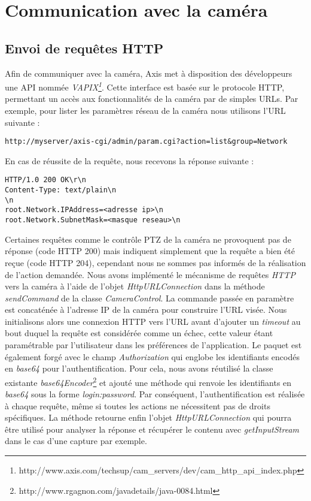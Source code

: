 \section{Communication avec la caméra}
\subsection{Envoi de requêtes HTTP}
Afin de communiquer avec la caméra, Axis met à disposition des développeurs une
API nommée \textit{VAPIX\footnote{\label{vapix}
http://www.axis.com/techsup/cam\_servers/dev/cam\_http\_api\_index.php}}. Cette
interface est basée sur le protocole HTTP, permettant un accès aux fonctionnalités de la caméra par de simples URLs. Par exemple, pour lister les paramètres réseau de la caméra nous utilisons l'URL suivante :
\begin{lstlisting}
http://myserver/axis-cgi/admin/param.cgi?action=list&group=Network
\end{lstlisting}
En cas de réussite de la requête, nous recevons la réponse suivante :
\begin{lstlisting}
HTTP/1.0 200 OK\r\n
Content-Type: text/plain\n
\n
root.Network.IPAddress=<adresse ip>\n
root.Network.SubnetMask=<masque reseau>\n
\end{lstlisting}

Certaines requêtes comme le contrôle PTZ de la caméra ne provoquent pas de réponse (code HTTP 200) mais indiquent simplement que la requête a bien été reçue (code HTTP 204), cependant nous ne sommes pas informés de la réalisation de l'action demandée.
Nous avons implémenté le mécanisme de requêtes \textit{HTTP} vers la caméra à l'aide de l'objet \textit{HttpURLConnection} dans la méthode \textit{sendCommand} de la classe \textit{CameraControl}. La commande passée en paramètre est concaténée à l'adresse IP de la caméra pour construire l'URL visée.
Nous initialisons alors une connexion HTTP vers l'URL avant d'ajouter un \textit{timeout} au bout duquel la requête est considérée comme un échec, cette valeur étant paramétrable par l'utilisateur dans les préférences de l'application. Le paquet est également forgé avec le champ \textit{Authorization} qui englobe les identifiants encodés en \textit{base64} pour l'authentification.
Pour cela, nous avons réutilisé la classe existante \textit{base64Encoder}\footnote{\label{base64}http://www.rgagnon.com/javadetails/java-0084.html} et ajouté une méthode qui renvoie les identifiants en \textit{base64} sous la forme \textit{login:password}. Par conséquent, l'authentification est réalisée à chaque requête, même si toutes les actions ne nécessitent pas de droits spécifiques.
La méthode retourne enfin l'objet \textit{HttpURLConnection} qui pourra être utilisé pour analyser la réponse et récupérer le contenu avec \textit{getInputStream} dans le cas d'une capture par exemple.

